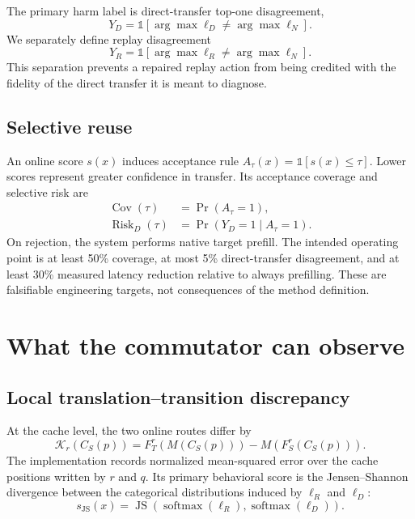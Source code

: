 \documentclass[10pt,twocolumn]{article}
\newcommand{\js}{\operatorname{JS}}
\newcommand{\risk}{\operatorname{Risk}}
\newcommand{\coverage}{\operatorname{Cov}}
\begin{document}
The primary harm label is direct-transfer top-one disagreement,
\begin{equation}
  Y_D = \mathbb{1}\!\left[\arg\max \ell_D \ne \arg\max \ell_N\right].
  \label{eq:direct-label}
\end{equation}
We separately define replay disagreement
\begin{equation}
  Y_R = \mathbb{1}\!\left[\arg\max \ell_R \ne \arg\max \ell_N\right].
  \label{eq:replay-label}
\end{equation}
This separation prevents a repaired replay action from being credited with
the fidelity of the direct transfer it is meant to diagnose.

\subsection{Selective reuse}

An online score $s(x)$ induces acceptance rule
$A_\tau(x)=\mathbb{1}[s(x)\leq\tau]$.  Lower scores represent greater
confidence in transfer.  Its acceptance coverage and selective risk are
\begin{align}
  \coverage(\tau) &= \Pr(A_\tau=1), \\
  \risk_D(\tau) &= \Pr(Y_D=1\mid A_\tau=1).
\end{align}
On rejection, the system performs native target prefill.  The intended
operating point is at least 50\% coverage, at most 5\% direct-transfer
disagreement, and at least 30\% measured latency reduction relative to always
prefilling.  These are falsifiable engineering targets, not consequences of
the method definition.

\section{What the commutator can observe}

\subsection{Local translation--transition discrepancy}

At the cache level, the two online routes differ by
\begin{equation}
  \mathcal{K}_r(C_S(p)) =
  F_T^r(M(C_S(p))) - M(F_S^r(C_S(p))).
  \label{eq:commutator}
\end{equation}
The implementation records normalized mean-squared error over the cache
positions written by $r$ and $q$.  Its primary behavioral score is the
Jensen--Shannon divergence between the categorical distributions induced by
$\ell_R$ and $\ell_D$:
\begin{equation}
  s_{\mathrm{JS}}(x)=
  \js\!\left(\operatorname{softmax}(\ell_R),
             \operatorname{softmax}(\ell_D)\right).
  \label{eq:js-score}
\end{equation}
\end{document}
